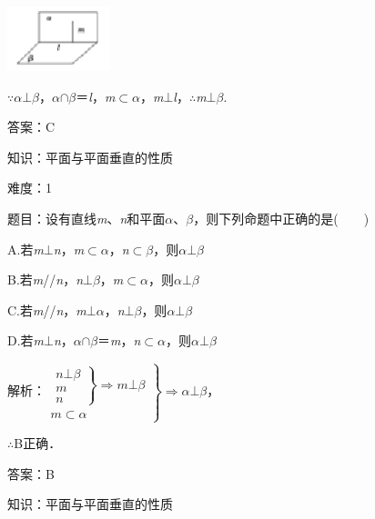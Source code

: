\documentclass{article} %
\begin{document}
\includegraphics*[width=1.18in, height=0.73in, keepaspectratio=false]{image250}

$\mathrm{\because}$\textit{$\alpha$}$\mathrm{\bot}$\textit{$\beta$}，\textit{$\alpha$}$\mathrm{\cap}$\textit{$\beta$}＝\textit{l}，\textit{m}$\mathrm{\subset }$\textit{$\alpha$}，\textit{m}$\mathrm{\bot}$\textit{l}，$\mathrm{\therefore}$\textit{m}$\mathrm{\bot}$\textit{$\beta$}.

答案：C

知识：平面与平面垂直的性质

难度：1

题目：设有直线\textit{m}、\textit{n}和平面\textit{$\alpha$}、\textit{$\beta$}，则下列命题中正确的是(　　)

A.若\textit{m}$\mathrm{\bot}$\textit{n}，\textit{m}$\mathrm{\subset }$\textit{$\alpha$}，\textit{n}$\mathrm{\subset }$\textit{$\beta$}，则\textit{$\alpha$}$\mathrm{\bot}$\textit{$\beta$}

B.若\textit{m}//\textit{n}，\textit{n}$\mathrm{\bot}$\textit{$\beta$}，\textit{m}$\mathrm{\subset }$\textit{$\alpha$}，则\textit{$\alpha$}$\mathrm{\bot}$\textit{$\beta$}

C.若\textit{m}//\textit{n}，\textit{m}$\mathrm{\bot}$\textit{$\alpha$}，\textit{n}$\mathrm{\bot}$\textit{$\beta$}，则\textit{$\alpha$}$\mathrm{\bot}$\textit{$\beta$}

D.若\textit{m}$\mathrm{\bot}$\textit{n}，\textit{$\alpha$}$\mathrm{\cap}$\textit{$\beta$}＝\textit{m}，\textit{n}$\mathrm{\subset }$\textit{$\alpha$}，则\textit{$\alpha$}$\mathrm{\bot}$\textit{$\beta$}

解析：$\left. \begin{array}{r}
\left. \begin{array}{r}
n\bot \beta\\
m\\ n
\end{array} \right\}\mathrm{\Rightarrow }m\mathrm{\bot}\beta\\
m\subset \alpha
\end{array} \right\}\mathrm{\Rightarrow }$\textit{$\alpha$}$\mathrm{\bot}$\textit{$\beta$}，

$\mathrm{\therefore}$B正确．

答案：B

知识：平面与平面垂直的性质
\end{document}
